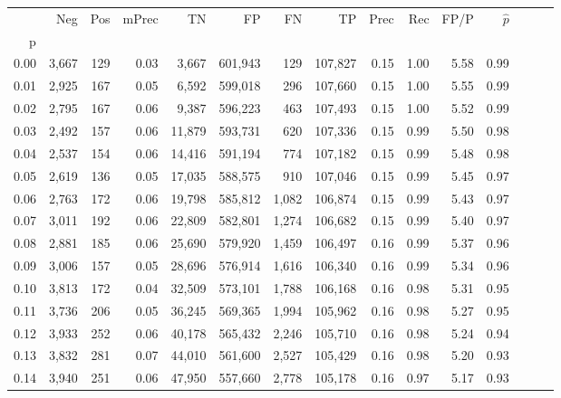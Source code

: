 \begin{tabular}{rrrrrrrrrrrrrrr}
\toprule
{} &     Neg &    Pos & mPrec &       TN &       FP &       FN &       TP &  Prec &   Rec &  FP/P & $\hat{p}$ \\
p    &         &        &       &          &          &          &          &       &       &       &           \\
\midrule
0.00 &   3,667 &    129 &  0.03 &    3,667 &  601,943 &      129 &  107,827 &  0.15 &  1.00 &  5.58 &      0.99 \\
0.01 &   2,925 &    167 &  0.05 &    6,592 &  599,018 &      296 &  107,660 &  0.15 &  1.00 &  5.55 &      0.99 \\
0.02 &   2,795 &    167 &  0.06 &    9,387 &  596,223 &      463 &  107,493 &  0.15 &  1.00 &  5.52 &      0.99 \\
0.03 &   2,492 &    157 &  0.06 &   11,879 &  593,731 &      620 &  107,336 &  0.15 &  0.99 &  5.50 &      0.98 \\
0.04 &   2,537 &    154 &  0.06 &   14,416 &  591,194 &      774 &  107,182 &  0.15 &  0.99 &  5.48 &      0.98 \\
0.05 &   2,619 &    136 &  0.05 &   17,035 &  588,575 &      910 &  107,046 &  0.15 &  0.99 &  5.45 &      0.97 \\
0.06 &   2,763 &    172 &  0.06 &   19,798 &  585,812 &    1,082 &  106,874 &  0.15 &  0.99 &  5.43 &      0.97 \\
0.07 &   3,011 &    192 &  0.06 &   22,809 &  582,801 &    1,274 &  106,682 &  0.15 &  0.99 &  5.40 &      0.97 \\
0.08 &   2,881 &    185 &  0.06 &   25,690 &  579,920 &    1,459 &  106,497 &  0.16 &  0.99 &  5.37 &      0.96 \\
0.09 &   3,006 &    157 &  0.05 &   28,696 &  576,914 &    1,616 &  106,340 &  0.16 &  0.99 &  5.34 &      0.96 \\
0.10 &   3,813 &    172 &  0.04 &   32,509 &  573,101 &    1,788 &  106,168 &  0.16 &  0.98 &  5.31 &      0.95 \\
0.11 &   3,736 &    206 &  0.05 &   36,245 &  569,365 &    1,994 &  105,962 &  0.16 &  0.98 &  5.27 &      0.95 \\
0.12 &   3,933 &    252 &  0.06 &   40,178 &  565,432 &    2,246 &  105,710 &  0.16 &  0.98 &  5.24 &      0.94 \\
0.13 &   3,832 &    281 &  0.07 &   44,010 &  561,600 &    2,527 &  105,429 &  0.16 &  0.98 &  5.20 &      0.93 \\
0.14 &   3,940 &    251 &  0.06 &   47,950 &  557,660 &    2,778 &  105,178 &  0.16 &  0.97 &  5.17 &      0.93 \\

\end{tabular}
